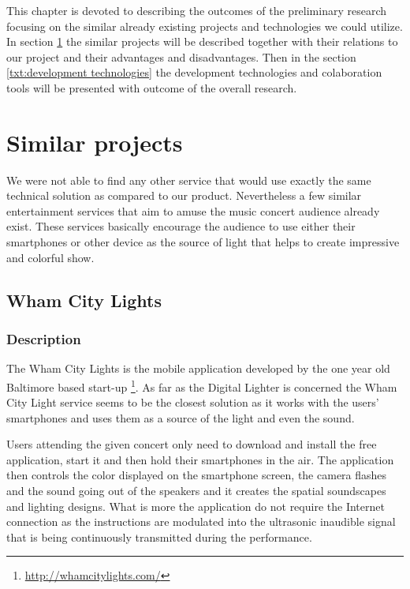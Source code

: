 This chapter is devoted to describing the outcomes of the preliminary research focusing on the similar already existing projects and technologies we could utilize.
In section \ref{txt:similar_projects} the similar projects will be described together with their relations to our project and their advantages and disadvantages. 
Then in the section \ref{txt:development technologies} the development technologies and colaboration tools will be presented with outcome of the overall research. 


\section{Similar projects} \label{txt:similar_projects}

We were not able to find any other service that would use exactly the same technical solution as compared to our product. 
Nevertheless a few similar entertainment services that aim to amuse the music concert audience already exist. 
These services basically encourage the audience to use either their smartphones or other device as the source of light that helps to create impressive and colorful show.

\subsection{Wham City Lights}

\subsubsection{Description}
The Wham City Lights is the mobile application developed by the one year old Baltimore based start-up \footnote{\url{http://whamcitylights.com/}}. 
As far as the Digital Lighter is concerned the Wham City Light service seems to be the closest solution as it works with the users' smartphones and uses them as a source of the light and even the sound.

Users attending the given concert only need to download and install the free application, start it and then hold their smartphones in the air.
The application then controls the color displayed on the smartphone screen, the camera flashes and the sound going out of the speakers and it creates the spatial soundscapes and lighting designs.
What is more the application do not require the Internet connection as the instructions are modulated into the ultrasonic inaudible signal that is being continuously transmitted during the performance.


